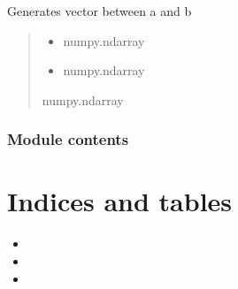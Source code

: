 \documentclass[letterpaper,10pt,english]{sphinxmanual}
\begin{document}
\begin{fulllineitems}
\label{\detokenize{som:som.kohonen.vet}}
\pysigstartsignatures
{}
\pysigstopsignatures
\sphinxAtStartPar
Generates vector between a and b
\begin{quote}\begin{description}
\begin{itemize}
\item {} 
\sphinxAtStartPar
{} \textendash{} numpy.ndarray

\item {} 
\sphinxAtStartPar
{} \textendash{} numpy.ndarray

\end{itemize}

\sphinxAtStartPar
numpy.ndarray

\end{description}\end{quote}

\end{fulllineitems}



\subsection{Module contents}
\label{\detokenize{som:module-som}}\label{\detokenize{som:module-contents}}

\chapter{Indices and tables}
\label{\detokenize{index:indices-and-tables}}\begin{itemize}
\item {} 
\sphinxAtStartPar
{}

\item {} 
\sphinxAtStartPar
{}

\item {} 
\sphinxAtStartPar
{}

\end{itemize}
\end{document}
